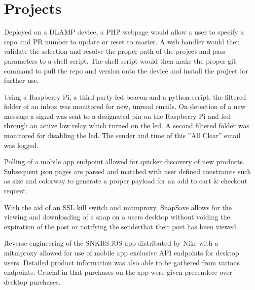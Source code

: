 \documentclass[]{deedy-resume-openfont}
\begin{document}
\begin{minipage}[t]{0.66\textwidth}

\section{Projects}
Deployed on a DLAMP device, a PHP webpage would allow a user to specify a repo and PR number to update or reset to master. A web handler would then validate the selection and resolve the proper path of the project and pass parameters to a shell script. The shell script would then make the proper git command to pull the repo and version onto the device and install the project for further use.
\sectionsep

Using a Raspberry Pi, a third party led beacon and a python script, the filtered folder
of an inbox was monitored for new, unread emails. On detection of a new message a
signal was sent to a designated pin on the Raspberry Pi and fed through an active low
relay which turned on the led. A second filtered folder was monitored for disabling
the led. The sender and time of this ”All Clear” email was logged.
\sectionsep


Polling of a mobile app endpoint allowed for quicker discovery of new products. Subsequent json pages are parsed and matched with user defined constraints such as size and colorway to generate a proper payload for an add to cart \& checkout request.
\sectionsep

With the aid of an SSL kill switch and mitmproxy, SnapSave allows for the viewing and
downloading of a snap on a users desktop without voiding the expiration of the post
or notifying the senderthat their post has been viewed.
\sectionsep

Reverse engineering of the SNKRS iOS app distributed by Nike with a mitmproxy
allowed for use of mobile app exclusive API endpoints for desktop users. Detailed
product information was also able to be gathered from various endpoints. Crucial in
that purchases on the app were given precendece over desktop purchases.
\sectionsep
\end{minipage} 
\end{document}
